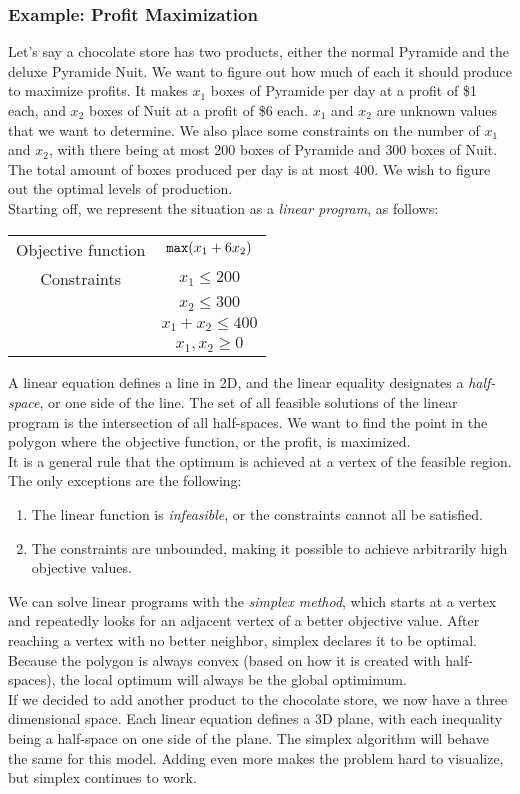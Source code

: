 \subsubsection{Example: Profit Maximization}
Let's say a chocolate store has two products, either the normal Pyramide and the deluxe Pyramide Nuit.
We want to figure out how much of each it should produce to maximize profits.
It makes $x_1$ boxes of Pyramide per day at a profit of \$1 each, and $x_{2}$ boxes of Nuit at a profit of \$6 each.
$x_1$ and $x_2$ are unknown values that we want to determine.
We also place some constraints on the number of $x_1$ and $x_2$, with there being at most $200$ boxes of Pyramide and $300$ boxes of Nuit.
The total amount of boxes produced per day is at most $400$.
We wish to figure out the optimal levels of production.\\
Starting off, we represent the situation as a \textit{linear program}, as follows:
\begin{center}
\begin{tabular}{c c}
  Objective function & $\verb|max|(x_1 + 6x_2)$\\
  Constraints & $x_1 \leq 200$\\
              & $x_2 \leq 300$\\
              & $x_{1} + x_{2} \leq 400$\\
              & $x_1, x_2 \geq 0$
\end{tabular}
\end{center}
A linear equation defines a line in 2D, and the linear equality designates a \textit{half-space}, or one side of the line.
The set of all feasible solutions of the linear program is the intersection of all half-spaces.
We want to find the point in the polygon where the objective function, or the profit, is maximized.\\
It is a general rule that the optimum is achieved at a vertex of the feasible region.
The only exceptions are the following:
\begin{enumerate}
  \item The linear function is \textit{infeasible}, or the constraints cannot all be satisfied.
  \item The constraints are unbounded, making it possible to achieve arbitrarily high objective values.
\end{enumerate}
We can solve linear programs with the \textit{simplex method}, which starts at a vertex and repeatedly looks for an adjacent vertex of a better objective value.
After reaching a vertex with no better neighbor, simplex declares it to be optimal.
Because the polygon is always convex (based on how it is created with half-spaces), the local optimum will always be the global optimimum.\\
If we decided to add another product to the chocolate store, we now have a three dimensional space.
Each linear equation defines a 3D plane, with each inequality being a half-space on one side of the plane.
The simplex algorithm will behave the same for this model.
Adding even more makes the problem hard to visualize, but simplex continues to work.

